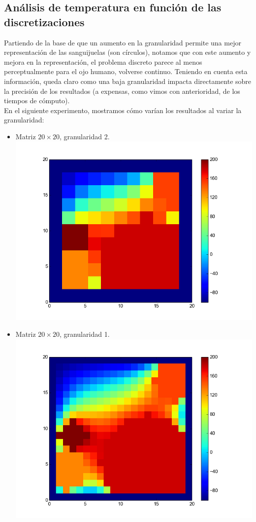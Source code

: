 \subsection{Análisis de temperatura en función de las discretizaciones}
Partiendo de la base de que un aumento en la granularidad permite una mejor representación de las sanguijuelas (son círculos), notamos que con este aumento y mejora en la representación, el problema discreto parece al menos perceptualmente para el ojo humano, volverse continuo. Teniendo en cuenta esta información, queda claro como una baja granularidad impacta directamente sobre la precisión de los resultados (a expensas, como vimos con anterioridad, de los tiempos de cómputo).
\\
En el siguiente experimento, mostramos cómo varían los resultados al variar la granularidad:
\begin{itemize}
 \item Matriz $20 \times 20$, granularidad 2.\\
  \includegraphics[width=400pt]{imagenes/imagen11.png}

 \item Matriz $20 \times 20$, granularidad 1.\\
  \includegraphics[width=400pt]{imagenes/imagen21.png}


\end{itemize}
